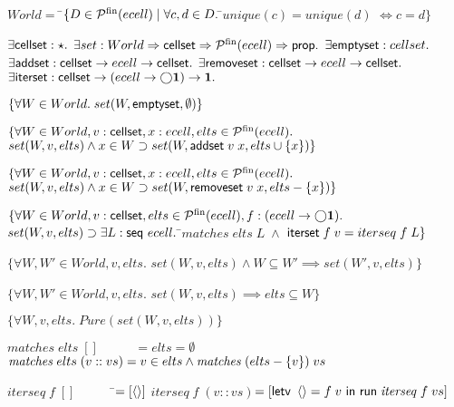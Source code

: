 \documentclass[natbib]{sigplanconf}
\begin{document}
{\small
\begin{specification}
\nextline
$World = $ \nextline
\;\;\;\;\=$\{D \in \mathcal{P}^{\mathrm{fin}}({ecell})\;|\;\forall c,d \in D.\;$\=$unique(c) = unique(d)$\nextline
        \>                                                      \>$\iff c = d\}$\nextline[0.5em]

$\exists \mbox{\textsf{{cellset}}} : \star.$ \nextline
$\exists set : World \Rightarrow \mbox{\textsf{{cellset}}} \Rightarrow \mathcal{P}^{\mathrm{fin}}({ecell}) \Rightarrow \mbox{\textsf{{prop}}}.$ \nextline
$\exists \mbox{\textsf{{emptyset}}}    : cellset.$ \nextline
$\exists \mbox{\textsf{{addset}}}      : \mbox{\textsf{{cellset}}} \to ecell \to \mbox{\textsf{{cellset}}}.$ \nextline
$\exists \mbox{\textsf{{removeset}}}   : \mbox{\textsf{{cellset}}} \to ecell \to \mbox{\textsf{{cellset}}}.$ \nextline
$\exists \mbox{\textsf{{iterset}}}     : \mbox{\textsf{{cellset}}} \to (ecell \to \bigcirc{\mathbf{1}}) \to \mathbf{1}.$\nextline[0.5em]

$\{{\forall W \in World.\; set(W, \mbox{\textsf{{emptyset}}}, \emptyset)}\}$ 

\specand \nextline[0.5em]

$\{\forall W \in World, v : \mbox{\textsf{{cellset}}}, x : ecell, elts \in \mathcal{P}^{\mathrm{fin}}({ecell}).$ \nextline 
\> $set(W, v, elts) \land x \in W \supset set(W, \mbox{\textsf{{addset}}}\;v\;x, elts \cup \{{x}\})\}$ \specand \nextline[0.5em]


$\{\forall W \in World, v : \mbox{\textsf{{cellset}}}, x : ecell, elts \in \mathcal{P}^{\mathrm{fin}}({ecell}).$ \nextline 
\> $set(W, v, elts) \land x \in W \supset set(W, \mbox{\textsf{{removeset}}}\;v\;x, elts - \{{x}\})\}$ \specand \nextline[0.5em]


$\{\forall W \in World, v : \mbox{\textsf{{cellset}}}, elts \in \mathcal{P}^{\mathrm{fin}}({ecell}), 
         f : (ecell \to \bigcirc{\mathbf{1}}).$ \nextline 
\> $set(W, v, elts) \supset \exists L : \mbox{\textsf{{seq }}}{ecell}.\;$\=$matches\;elts\;L\; \land$ \nextline
\>                                \>$\mbox{\textsf{{iterset}}}\;f\;v = iterseq\;f\;L\}$ \specand \nextline[0.5em]


$\{\forall W, W' \in World, v, elts.$ \nextline
\>$set(W,v,elts) \land W \subseteq W' \implies set(W',v, elts)\}$\specand \nextline[0.5em]

$\{\forall W, W' \in World, v, elts.$ \nextline
\>$set(W, v, elts) \implies elts \subseteq W\}$ \specand \nextline[0.5em]

$\{\forall W, v, elts.\; \mathit{Pure}(set(W,v,elts))\}$ \nextline[0.5em]
  

$\mathit{matches}\;elts\;[] \qquad\;\;\; = elts = \emptyset$ \nextline
$\mathit{matches}\;elts\;(v :: vs) = v \in elts \land \mathit{matches}\;(elts - \{{v}\})\;vs$ \nextline[0.5em]

$\mathit{iterseq}\; f\; [] \qquad\;\;\;\;$\=$= [\left<\right>]$ \nextline
$\mathit{iterseq}\; f\; (v :: vs)$\>$= [\mbox{\textsf{{letv }}}\left<\right> = f\;v\mbox{\textsf{{ in }}}\mbox{\textsf{{run}}}\;\mathit{iterseq}\;f\;vs]$ 
\end{specification}
}
\end{document}
